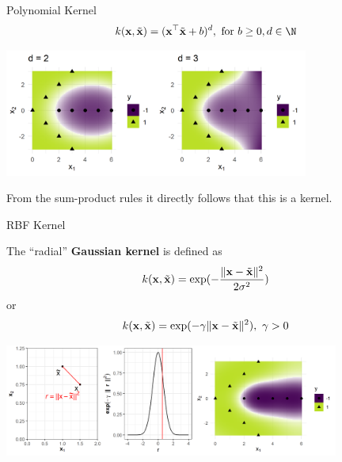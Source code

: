 \documentclass[11pt,compress,t,notes=noshow, xcolor=table]{beamer}
\begin{document}
\begin{vbframe}{Polynomial Kernel}
  $$k(\xv, \tilde \xv) = (\xv^\top \tilde \xv + b)^d, \text{ for } b\geq 0, d \in \N$$

\begin{center}
\includegraphics[width = 10cm ]{figure/svm_poly_kernel.png}
\end{center}

From the sum-product rules it directly follows that this is a kernel.
\end{vbframe}

\begin{vbframe}{RBF Kernel}

The \enquote{radial} \textbf{Gaussian kernel} is defined as
$$k(\mathbf{x}, \tilde {\mathbf{x}}) = \exp(-\frac{\|\mathbf{x} - \tilde {\mathbf{x}}\|^2}{2\sigma^2})$$ 
or 
$$k(\mathbf{x}, \tilde {\mathbf{x}}) = \exp(-\gamma \|\mathbf{x} - \tilde {\mathbf{x}}\|^2), ~ \gamma>0$$

\begin{center}
\includegraphics[width = 11cm ]{figure/svm_rbf_kernel.png}
\end{center}
\end{vbframe}
\end{document}
